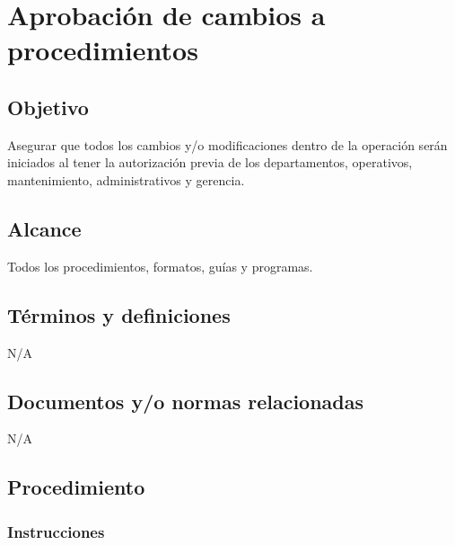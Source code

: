 \renewcommand{\MayorVer}{2}
\renewcommand{\MenorVer}{1}
\renewcommand{\Codigo}{PSA-1-PROG} %
\renewcommand{\FechaPub}{2023--01}
\renewcommand{\Titulo}{Aprobación de cambios a procedimientos}

\section{\Titulo}


\subsection{Objetivo}

Asegurar que todos los cambios y/o modificaciones dentro de la operación serán iniciados al tener la autorización previa de los departamentos, operativos, mantenimiento, administrativos y gerencia.

\subsection{Alcance}

Todos los procedimientos, formatos, guías y programas.

\subsection{Términos y definiciones}

N/A

\subsection{Documentos y/o normas relacionadas}

N/A

\subsection{Procedimiento}

\subsubsection{Instrucciones}

